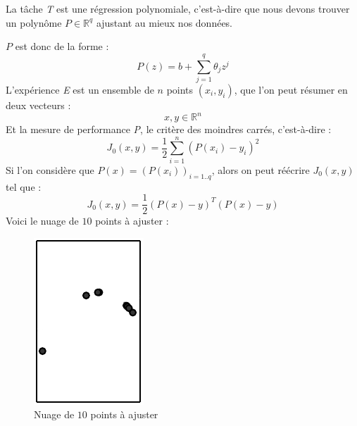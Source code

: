\documentclass[a4paper, 11pt]{report}
\begin{document}
La tâche \emph{T} est une régression polynomiale, c'est-à-dire que nous devons trouver un polynôme $P \in \mathbb{R}^{q}$ ajustant au mieux nos données.

$P$ est donc de la forme :
$$P(z) = b + \sum_{j=1}^{q}{\theta_j z^j}$$
L'expérience \emph{E} est un ensemble de $n$ points $(x_i,y_i)$, que l'on peut résumer en deux vecteurs :
$$x, y \in \mathbb{R}^n$$
Et la mesure de performance \emph{P}, le critère des moindres carrés, c'est-à-dire :
$$J_0(x,y) =\frac{1}{2} \sum_{i=1}^{n}{(P(x_i)-y_i)^2}$$
Si l'on considère que $P(x) = (P(x_i))_{i=1..q}$, alors on peut réécrire $J_0(x,y)$ tel que :
$$J_0(x,y) = \frac{1}{2} (P(x)-y)^T(P(x)-y)$$
Voici le nuage de $10$ points à ajuster :
\begin{figure}[H]
	\begin{center}
		\includegraphics[scale=0.5]{Images/Fitting_Problem.png}
		\caption{Nuage de $10$ points à ajuster}		
	\end{center}
\end{figure}
			
\end{document}
